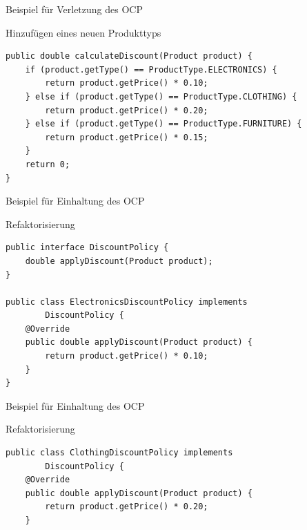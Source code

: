 \begin{frame}[fragile]{Beispiel für Verletzung des OCP}
	\begin{alertblock}{Hinzufügen eines neuen Produkttyps}
        \begin{lstlisting}
public double calculateDiscount(Product product) {
    if (product.getType() == ProductType.ELECTRONICS) {
        return product.getPrice() * 0.10;
    } else if (product.getType() == ProductType.CLOTHING) {
        return product.getPrice() * 0.20;
    } else if (product.getType() == ProductType.FURNITURE) {
        return product.getPrice() * 0.15; 
    }
    return 0;
}
        \end{lstlisting} 		
 	\end{alertblock}
\end{frame}

\begin{frame}[fragile]{Beispiel für Einhaltung des OCP}
	\begin{exampleblock}{Refaktorisierung}
        \begin{lstlisting}
public interface DiscountPolicy {
    double applyDiscount(Product product);
}

public class ElectronicsDiscountPolicy implements 
        DiscountPolicy {
    @Override
    public double applyDiscount(Product product) {
        return product.getPrice() * 0.10;
    }
}
        \end{lstlisting} 		
 	\end{exampleblock}
\end{frame}

\begin{frame}[fragile]{Beispiel für Einhaltung des OCP}
	\begin{exampleblock}{Refaktorisierung}
        \begin{lstlisting}
public class ClothingDiscountPolicy implements 
        DiscountPolicy {
    @Override
    public double applyDiscount(Product product) {
        return product.getPrice() * 0.20; 
    }
        \end{lstlisting} 		
 	\end{exampleblock}
\end{frame}

